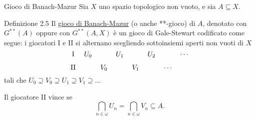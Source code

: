 \documentclass[babel]{beamer}
\renewcommand{\href}[2]{#2}
\begin{document}
\begin{frame}[label={sec:org109220f}]{Gioco di Banach-Mazur}
Sia \(X\) uno \href{../../../../../../../org/roam/20250103145124-topologia.org}{spazio topologico} non vuoto, e sia \(A \subseteq X\).
\begin{block}{Definizione 2.5}
Il \uline{gioco di Banach-Mazur} (o anche **-gioco) di \(A\), denotato con \(G^{ * *}(A)\) oppure con \(G^{ * *}(A,X)\) è un \href{../../../../../../../org/roam/20250513155732-logic_game.org}{gioco} \href{../../../../../../../org/roam/20250513171520-giochi_di_gale_stewart.org}{di Gale-Stewart} codificato come segue: i giocatori I e II si alternano scegliendo sottoinsiemi aperti non vuoti di \(X\)
\begin{equation*}
\begin{tikzcd}[ampersand replacement=\&,cramped,sep=tiny]
	{\text{I}} \& {U_0} \&\& {U_1} \&\& {U_2} \&\& \cdots \\
	{\text{II}} \&\& {V_0} \&\& {V_1} \&\& \cdots
\end{tikzcd}
\end{equation*}
\href{../../../../../../../org/roam/20250513171520-giochi_di_gale_stewart.org}{tali che} \(U_{0}\supseteq V_{0}\supseteq U_{1}\supseteq V_{1}\supseteq \dots\)

Il giocatore II vince se
\begin{equation*}
\bigcap_{n \in \omega} U_{n} = \bigcap_{n \in \omega} V_{n} \subseteq A.
\end{equation*}
\end{block}
\end{frame}
\end{document}
